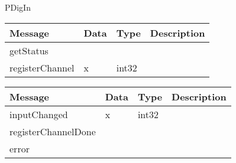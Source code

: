  {PDigIn}

\begin{tabular}[ht]{|l|l|l|p{8cm}|}
\hline
Message & Data & Type & Description\\
\hline
getStatus &  &  & \\
\hline
registerChannel &  x  &  int32  & \\
\hline
\end{tabular}
\begin{tabular}[ht]{|l|l|l|p{8cm}|}
\hline
Message & Data & Type & Description\\
\hline
inputChanged &  x  &  int32  & \\
\hline
registerChannelDone &  &  & \\
\hline
error &  &  & \\
\hline
\end{tabular}
